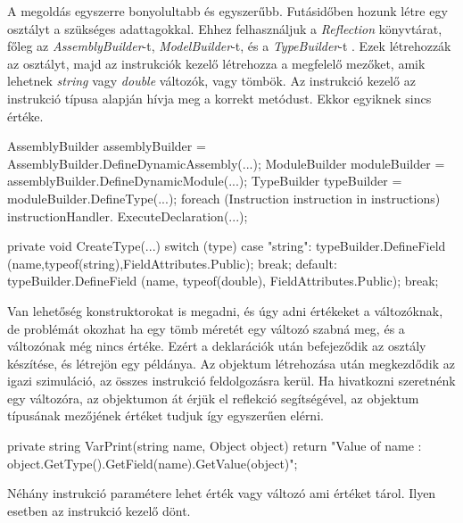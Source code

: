 A megoldás egyszerre bonyolultabb és egyszerűbb. Futásidőben hozunk létre egy osztályt a szükséges adattagokkal. Ehhez felhasználjuk a \textit{Reflection} \cite{reflection} könyvtárat, főleg az \textit{AssemblyBuilder}-t, \textit{ModelBuilder}-t, és a \textit{TypeBuilder}-t \cite{assembly_builder}. Ezek létrehozzák az osztályt, majd az instrukciók kezelő létrehozza a megfelelő mezőket, amik lehetnek \textit{string} vagy \textit{double} változók, vagy tömbök. Az instrukció kezelő az instrukció típusa alapján hívja meg a korrekt metódust. Ekkor egyiknek sincs értéke.

\begin{cpp}
AssemblyBuilder assemblyBuilder = 
AssemblyBuilder.DefineDynamicAssembly(...);
ModuleBuilder moduleBuilder = 
assemblyBuilder.DefineDynamicModule(...);
TypeBuilder typeBuilder = moduleBuilder.DefineType(...);
foreach (Instruction instruction in instructions)
{
    instructionHandler.
    ExecuteDeclaration(...);
}


private void CreateType(...)
{
	switch (type)
    {
    	case "string":
        	typeBuilder.DefineField
            (name,typeof(string),FieldAttributes.Public);
            break;
		default:
        	typeBuilder.DefineField
            (name, typeof(double), FieldAttributes.Public);
            break;
    }
}
\end{cpp}

Van lehetőség konstruktorokat is megadni, és úgy adni értékeket a változóknak, de problémát okozhat ha egy tömb méretét egy változó szabná meg, és a változónak még nincs értéke. Ezért a deklarációk után befejeződik az osztály készítése, és létrejön egy példánya.
Az objektum létrehozása után megkezdődik az igazi szimuláció, az összes instrukció feldolgozásra kerül. Ha hivatkozni szeretnénk egy változóra, az objektumon át érjük el reflekció segítségével, az objektum típusának mezőjének értéket tudjuk így egyszerűen elérni.

\begin{cpp}
private string VarPrint(string name, Object object)
{
	return "Value of {name} : 
    {object.GetType().GetField(name).GetValue(object)}";
}
\end{cpp}

Néhány instrukció paramétere lehet érték vagy változó ami értéket tárol. Ilyen esetben az instrukció kezelő dönt.

